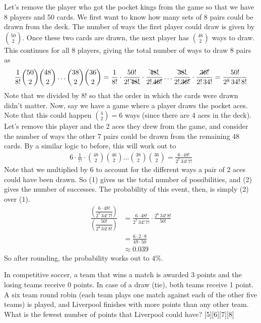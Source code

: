 \documentclass[12pt]{article}
\newcounter{problem}
\begin{document}
\begin{solution}[E]
   Let's remove the player who got the pocket kings from the game so that we have 8 players and 50 cards. We first want to know how many sets of 8 pairs could be drawn from the deck. The number of ways the first player could draw is given by $\binom{50}{2}$. Once these two cards are drawn, the next player has $\binom{48}{2}$ ways to draw. This continues for all 8 players, giving the total number of ways to draw 8 pairs as
    \begin{align} \setcounter{equation}{0}
        \frac{1}{8!}\binom{50}{2}\binom{48}{2}\dots\binom{38}{2}\binom{36}{2}
        =\frac{1}{8!}\cdot\frac{50!}{2!\,\bcancel{48!}}\cdot\frac{\bcancel{48!}}{2!\,\cancel{46!}}\dots\frac{\bcancel{38!}}{2!\,\cancel{36!}}\cdot\frac{\cancel{36!}}{2!\,34!}
        = \frac{50!}{2^8\,34!\,8!}
    \end{align}
    Note that we divided by 8! so that the order in which the cards were drawn didn't matter.\medbreak
    Now, say we have a game where a player draws the pocket aces. Note that this could happen $\binom{4}{2}=6$ ways (since there are 4 aces in the deck). Let's remove this player and the 2 aces they drew from the game, and consider the number of ways the other 7 pairs could be drawn from the remaining 48 cards. By a similar logic to before, this will work out to
    \begin{align}
        6\cdot\frac{1}{7!}\cdot\binom{48}{2}\binom{46}{2}\dots\binom{38}{2}\binom{36}{2}
        = \frac{6\cdot48!}{2^7\,34!\,7!}
    \end{align}
    Note that we multiplied by 6 to account for the different ways a pair of 2 aces could have been drawn. So (1) gives us the total number of possibilities, and (2) gives the number of successes. The probability of this event, then, is simply (2) over (1).
    \begin{align*}
        \frac{\left(\dfrac{6\cdot48!}{2^7\,34!\,7!}\right)}{\left(\dfrac{50!}{2^8\,34!\,8!}\right)} &= \frac{6\cdot48!}{2^7\,34!\,7!} \cdot \frac{2^8\,34!\,8!}{50!} \\
        &=\frac{6\cdot2\cdot8}{49\cdot50} \\[2mm]
        &\approx 0.039
    \end{align*}
    So after rounding, the probability works out to $\boxed{4\%}$.
\end{solution}

\begin{problem}
   In competitive soccer, a team that wins a match is awarded 3 points and the losing teams receive 0 points. In case of a draw (tie), both teams receive 1 point. A six team round robin (each team plays one match against each of the other five teams) is played, and Liverpool finishes with more points than any other team. What is the fewest number of points that Liverpool could have?
   [5][6][7][8]
\end{problem}
\end{document}
